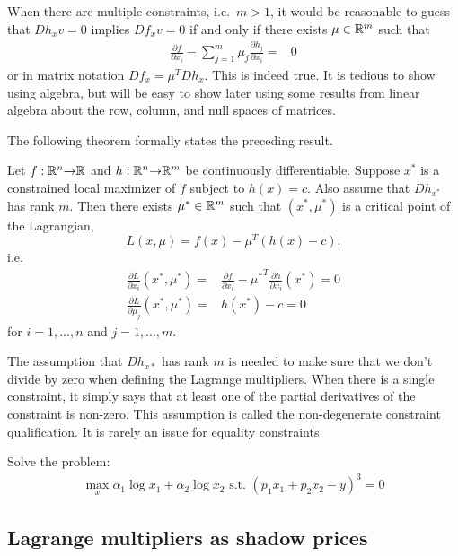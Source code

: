 When there are multiple constraints, i.e.\ $m>1$, it would be
reasonable to guess that $Dh_x v = 0$ implies $Df_x v = 0$ if and only
if there exists $\mu \in \mathbb{R}^m$ such that 
\begin{align*}
  \frac{\partial f}{\partial x_i} - \sum_{j=1}^m \mu_j  \frac{\partial
    h_j}{\partial x_i} = & 0 
\end{align*}
or in matrix notation $Df_x = \mu^T Dh_x$. This is indeed true. It is
tedious to show using algebra, but will be easy to show later using
some results from linear algebra about the row, column, and null
spaces of matrices. 

The following theorem formally states the preceding result.
\begin{theorem} \label{thm:econ} Let $f:\mathbb{R}^n {\rightarrow} \mathbb{R}$ and $h: \mathbb{R}^n {\rightarrow}
  \mathbb{R}^m$ be continuously differentiable. Suppose $x^*$ is a constrained
  local maximizer of $f$ subject to $h(x) = c$. Also assume that
  $Dh_{x^*}$ has rank $m$. Then there exists $\mu^* \in \mathbb{R}^m$ such
  that $(x^*, \mu^*)$ is a critical point of the Lagrangian,
  \[ L(x,\mu) = f(x) - \mu^T (h(x) - c). \]
  i.e.
  \begin{align*}
    \frac{\partial L}{\partial x_i}(x^*,\mu^*) = & \frac{\partial
      f}{\partial x_i} - {\mu^*}^T \frac{\partial h}{\partial
      x_i}(x^*) = 0 \\
    \frac{\partial L}{\partial \mu_j}(x^*,\mu^*) = & h(x^*) -
    c = 0
  \end{align*}
  for $i = 1, ..., n$ and $j=1,...,m$.
\end{theorem}
The assumption that $Dh_{x*}$ has rank $m$ is needed to make sure that
we don't divide by zero when defining the Lagrange multipliers. When
there is a single constraint, it simply says that at least one of the
partial derivatives of the constraint is non-zero. This assumption is
called the non-degenerate constraint qualification. It is rarely an
issue for equality constraints.

\begin{example}
  Solve the problem:
  \begin{align*}
    \max_{x} \alpha_1 \log x_1 + \alpha_2 \log x_2 \text{ s.t. } (p_1
    x_1 + p_2 x_2 - y)^3 = 0
  \end{align*}
\end{example}

\subsection{Lagrange multipliers as shadow prices}

